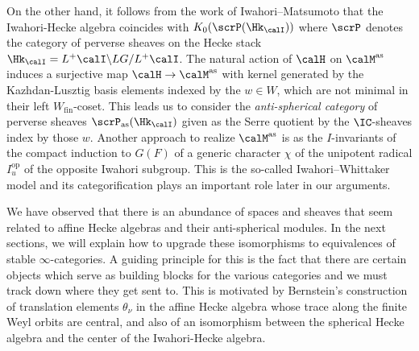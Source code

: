 \documentclass[10pt, reqno]{amsart}
\theoremstyle{plain}
\theoremstyle{definition}
\numberwithin{equation}{section}
\begin{document}
	On the other hand, it follows from the work of Iwahori--Matsumoto \cite{IM65} that the Iwahori-Hecke algebra coincides with $K_0(\scrP(\Hk_{\calI}))$ where $\scrP$ denotes the category of perverse sheaves on the Hecke stack $\Hk_{\calI}=L^+\calI\backslash LG/L^+\calI$. The natural action of $\calH$ on $\calM^\mathrm{as}$ induces a surjective map $\calH\rightarrow \calM^\mathrm{as}$ with kernel generated by the Kazhdan-Lusztig basis elements indexed by the $w\in W$, which are not minimal in their left $W_{\mathrm{fin}}$-coset. This leads us to consider the \textit{anti-spherical category} of perverse sheaves $\scrP_{\mathrm{as}}(\Hk_{\calI})$ given as the Serre quotient by the $\IC$-sheaves index by those $w$.
	Another approach to realize $\calM^{\mathrm{as}}$ is as the $I$-invariants of the compact induction to $G(F)$ of a generic character $\chi$ of the unipotent radical $I_u^\mathrm{op}$ of the opposite Iwahori subgroup. This is the so-called Iwahori--Whittaker model and its categorification plays an important role later in our arguments.
	
	We have observed that there is an abundance of spaces and sheaves that seem related to affine Hecke algebras and their anti-spherical modules. In the next sections, we will explain how to upgrade these isomorphisms to equivalences of stable $\infty$-categories. A guiding principle for this is the fact that there are certain objects which serve as building blocks for the various categories and we must track down where they get sent to. This is motivated by Bernstein's construction of translation elements $\theta_\nu$ in the affine Hecke algebra whose trace along the finite Weyl orbits are central, and also of an isomorphism between the spherical Hecke algebra and the center of the Iwahori-Hecke algebra.
	
	
\end{document}
